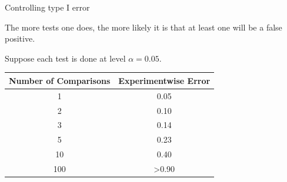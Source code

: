 \documentclass[ignorenonframetext,]{beamer}
\begin{document}
\begin{frame}{Controlling type I error}

The more tests one does, the more likely it is that at least one will be
a false positive. \medskip

Suppose each test is done at level \(\alpha = 0.05\).

\begin{longtable}[c]{@{}cc@{}}
\toprule
\begin{minipage}[b]{0.34\columnwidth}\centering\strut
Number of Comparisons
\strut\end{minipage} &
\begin{minipage}[b]{0.38\columnwidth}\centering\strut
Experimentwise Error
\strut\end{minipage}\tabularnewline
\midrule
\endhead
\begin{minipage}[t]{0.34\columnwidth}\centering\strut
1
\strut\end{minipage} &
\begin{minipage}[t]{0.38\columnwidth}\centering\strut
0.05
\strut\end{minipage}\tabularnewline
\begin{minipage}[t]{0.34\columnwidth}\centering\strut
2
\strut\end{minipage} &
\begin{minipage}[t]{0.38\columnwidth}\centering\strut
0.10
\strut\end{minipage}\tabularnewline
\begin{minipage}[t]{0.34\columnwidth}\centering\strut
3
\strut\end{minipage} &
\begin{minipage}[t]{0.38\columnwidth}\centering\strut
0.14
\strut\end{minipage}\tabularnewline
\begin{minipage}[t]{0.34\columnwidth}\centering\strut
5
\strut\end{minipage} &
\begin{minipage}[t]{0.38\columnwidth}\centering\strut
0.23
\strut\end{minipage}\tabularnewline
\begin{minipage}[t]{0.34\columnwidth}\centering\strut
10
\strut\end{minipage} &
\begin{minipage}[t]{0.38\columnwidth}\centering\strut
0.40
\strut\end{minipage}\tabularnewline
\begin{minipage}[t]{0.34\columnwidth}\centering\strut
100
\strut\end{minipage} &
\begin{minipage}[t]{0.38\columnwidth}\centering\strut
\textgreater{}0.90
\strut\end{minipage}\tabularnewline
\bottomrule
\end{longtable}

\end{frame}
\end{document}
